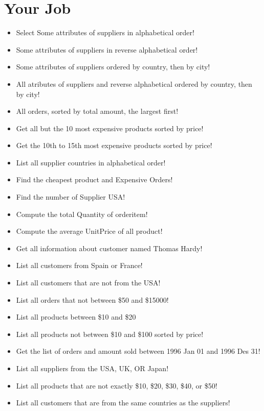 \documentclass[
]{book}
\providecommand{\tightlist}{%
  \setlength{\itemsep}{0pt}\setlength{\parskip}{0pt}}
\begin{document}
\hypertarget{your-job-3}{%
\section{Your Job}\label{your-job-3}}

\begin{itemize}
\tightlist
\item
  Select Some attributes of suppliers in alphabetical order!
\item
  Some attributes of suppliers in reverse alphabetical order!
\item
  Some attributes of suppliers ordered by country, then by city!
\item
  All atributes of suppliers and reverse alphabetical ordered by country, then by city!
\item
  All orders, sorted by total amount, the largest first!
\item
  Get all but the 10 most expensive products sorted by price!
\item
  Get the 10th to 15th most expensive products sorted by price!
\item
  List all supplier countries in alphabetical order!
\item
  Find the cheapest product and Expensive Orders!
\item
  Find the number of Supplier USA!
\item
  Compute the total Quantity of orderitem!
\item
  Compute the average UnitPrice of all product!
\item
  Get all information about customer named Thomas Hardy!
\item
  List all customers from Spain or France!
\item
  List all customers that are not from the USA!
\item
  List all orders that not between \$50 and \$15000!
\item
  List all products between \$10 and \$20
\item
  List all products not between \$10 and \$100 sorted by price!
\item
  Get the list of orders and amount sold between 1996 Jan 01 and 1996 Des 31!
\item
  List all suppliers from the USA, UK, OR Japan!
\item
  List all products that are not exactly \$10, \$20, \$30, \$40, or \$50!
\item
  List all customers that are from the same countries as the suppliers!

\end{itemize}
\end{document}
